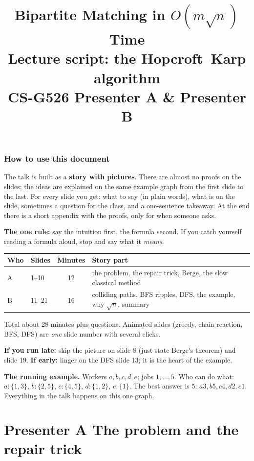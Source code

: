\documentclass[11pt,a4paper]{article}
\title{\textbf{Bipartite Matching in $O(m\sqrt n)$ Time}\\[2pt]
\large Lecture script: the Hopcroft--Karp algorithm\\[2pt]
\normalsize CS-G526 \quad Presenter A \& Presenter B}
\author{}\date{}
\begin{document}
\maketitle

\section*{How to use this document}
The talk is built as a \textbf{story with pictures}. There are almost no proofs on the slides; the ideas are explained on the same example graph from the first slide to the last. For every slide you get: what to say (in plain words), what is on the slide, sometimes a question for the class, and a one-sentence takeaway. At the end there is a short appendix with the proofs, only for when someone asks.

\textbf{The one rule:} say the intuition first, the formula second. If you catch yourself reading a formula aloud, stop and say what it \emph{means}.

\begin{center}
\begin{tabular}{llcl}
\toprule
\textbf{Who} & \textbf{Slides} & \textbf{Minutes} & \textbf{Story part}\\
\midrule
A & 1--10 & 12 & the problem, the repair trick, Berge, the slow classical method\\
B & 11--21 & 16 & colliding paths, BFS ripples, DFS, the example, why $\sqrt n$, summary\\
\bottomrule
\end{tabular}
\end{center}
Total about 28 minutes plus questions. Animated slides (greedy, chain reaction, BFS, DFS) are \emph{one} slide number with several clicks.

\textbf{If you run late:} skip the picture on slide 8 (just state Berge's theorem) and slide 19. \textbf{If early:} linger on the DFS slide 13; it is the heart of the example.

\textbf{The running example.} Workers $a,b,c,d,e$; jobs $1,\dots,5$. Who can do what: $a\!:\!\{1,3\}$, $b\!:\!\{2,5\}$, $c\!:\!\{4,5\}$, $d\!:\!\{1,2\}$, $e\!:\!\{1\}$. The best answer is $5$: $a3,b5,c4,d2,e1$. Everything in the talk happens on this one graph.

\part*{Presenter A \quad The problem and the repair trick}
\end{document}
